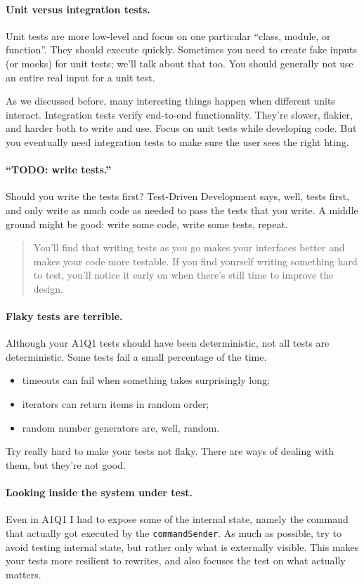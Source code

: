 \documentclass[11pt]{article}
\begin{document}
\paragraph{Unit versus integration tests.} Unit tests are more low-level and focus on 
one particular ``class, module, or function''. They should execute quickly. Sometimes you 
need to create fake inputs (or mocks) for unit tests; we'll talk about that too. You should generally
not use an entire real input for a unit test.

As we discussed before, many interesting things happen when different units interact.
Integration tests verify end-to-end functionality. They're slower, flakier, and harder both
to write and use. Focus on unit tests while developing code. But you eventually need
integration tests to make sure the user sees the right hting.

\paragraph{``TODO: write tests.''} Should you write the tests first? Test-Driven Development says, well,
tests first, and only write as much code as needed to pass the tests that you write. 
A middle ground might be good: write some code, write some tests, repeat.

\begin{quote}
You'll find that writing tests as you go makes your interfaces better and makes your code more testable. If you find yourself writing something hard to test, you’ll notice it early on when there’s still time to improve the design.
\end{quote}

\paragraph{Flaky tests are terrible.} Although your A1Q1 tests should have been 
deterministic, not all tests are deterministic. Some tests fail a small percentage
of the time. 
\begin{itemize}
\item timeouts can fail when something takes surprisingly long;
\item iterators can return items in random order;
\item random number generators are, well, random.
\end{itemize}
Try really hard to make your tests not flaky. There are ways of dealing with them,
but they're not good.

\paragraph{Looking inside the system under test.}
Even in A1Q1 I had to expose some of the internal state, namely the command that actually
got executed by the {\tt commandSender}. As much as possible, try to avoid testing internal
state, but rather only what is externally visible. This makes your tests more resilient to rewrites,
and also focuses the test on what actually matters.
\end{document}
